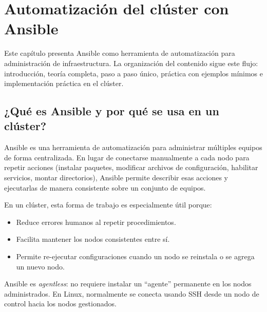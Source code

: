 
\chapter{Automatización del clúster con Ansible}
\label{chap:ansible}

Este capítulo presenta Ansible como herramienta de automatización para administración de infraestructura. La organización del contenido sigue este flujo: introducción, teoría completa, paso a paso único, práctica con ejemplos mínimos e implementación práctica en el clúster.


\section{¿Qué es Ansible y por qué se usa en un clúster?}
\label{sec:ansible_que_es}

Ansible es una herramienta de automatización para administrar múltiples equipos de forma centralizada. En lugar de conectarse manualmente a cada nodo para repetir acciones (instalar paquetes, modificar archivos de configuración, habilitar servicios, montar directorios), Ansible permite describir esas acciones y ejecutarlas de manera consistente sobre un conjunto de equipos.

En un clúster, esta forma de trabajo es especialmente útil porque:
\begin{itemize}
  \item Reduce errores humanos al repetir procedimientos.
  \item Facilita mantener los nodos consistentes entre sí.
  \item Permite re-ejecutar configuraciones cuando un nodo se reinstala o se agrega un nuevo nodo.
\end{itemize}

Ansible es \textit{agentless}: no requiere instalar un ``agente'' permanente en los nodos administrados. En Linux, normalmente se conecta usando SSH desde un nodo de control hacia los nodos gestionados. \cite{rh_how_ansible_works,ansible_installation_guide}


